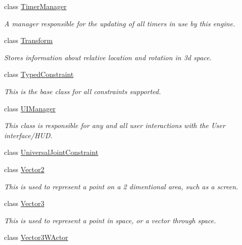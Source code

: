 \begin{DoxyCompactItemize}
class \hyperlink{classMezzanine_1_1TimerManager}{TimerManager}
\begin{DoxyCompactList}\small\item\em A manager responsible for the updating of all timers in use by this engine. \item\end{DoxyCompactList}\item 
class \hyperlink{classMezzanine_1_1Transform}{Transform}
\begin{DoxyCompactList}\small\item\em Stores information about relative location and rotation in 3d space. \item\end{DoxyCompactList}\item 
class \hyperlink{classMezzanine_1_1TypedConstraint}{TypedConstraint}
\begin{DoxyCompactList}\small\item\em This is the base class for all constraints supported. \item\end{DoxyCompactList}\item 
class \hyperlink{classMezzanine_1_1UIManager}{UIManager}
\begin{DoxyCompactList}\small\item\em This class is responsible for any and all user interactions with the User interface/HUD. \item\end{DoxyCompactList}\item 
class \hyperlink{classMezzanine_1_1UniversalJointConstraint}{UniversalJointConstraint}
\item 
class \hyperlink{classMezzanine_1_1Vector2}{Vector2}
\begin{DoxyCompactList}\small\item\em This is used to represent a point on a 2 dimentional area, such as a screen. \item\end{DoxyCompactList}\item 
class \hyperlink{classMezzanine_1_1Vector3}{Vector3}
\begin{DoxyCompactList}\small\item\em This is used to represent a point in space, or a vector through space. \item\end{DoxyCompactList}\item 
class \hyperlink{classMezzanine_1_1Vector3WActor}{Vector3WActor}

\end{DoxyCompactItemize}
